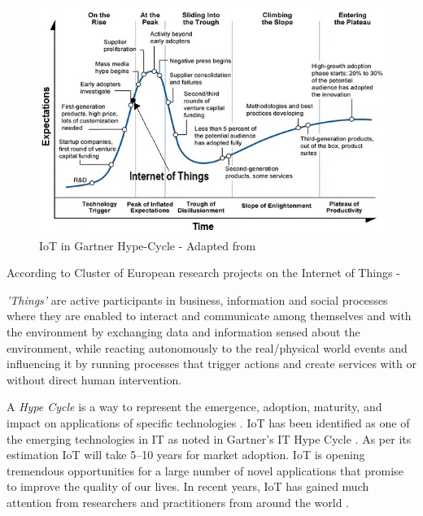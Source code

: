 \begin{figure}[h!]
	\includegraphics[scale=0.8]{./gfx/hypecycle}
	\centering
	\caption{\acs{IoT} in Gartner Hype-Cycle - Adapted from \cite{PICHYPECYC,HYPECYCGARTNER}}
	\label{fig:2.7}
\end{figure}
According to Cluster of European research projects on the Internet of Things -
\begin{definition}
\textit{'Things'} are active participants in business, information and social processes where they are enabled to interact and communicate among themselves and with the environment by exchanging data and information sensed about the environment, while reacting autonomously to the real/physical world events and influencing it by running processes that trigger actions and create services with or without direct human intervention.
\end{definition}
A \textit{Hype Cycle} is a way to represent the emergence, adoption, maturity, and impact on applications of specific technologies \cite{HYPECYCGARTNER}. \acs{IoT} has been identified as one of the emerging technologies in \acs{IT} as noted in Gartner’s \acs{IT} Hype Cycle .  As per its estimation \acs{IoT} will take 5–10 years for market adoption. \acs{IoT} is opening tremendous opportunities for a large number of novel applications that promise to improve the quality of our lives. In recent years, \acs{IoT} has gained much attention from researchers and practitioners from around the world \cite{HYPECYCGARTNER,IOTXIA}.
